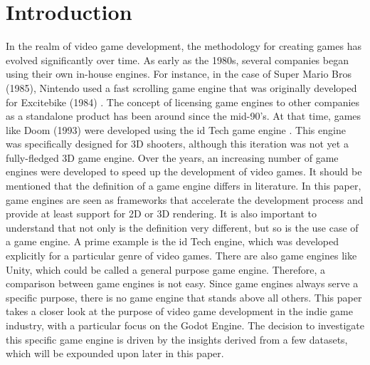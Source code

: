 \section{Introduction}
In the realm of video game development, the methodology for creating games has evolved significantly over time.
As early as the 1980s, several companies began using their own in-house engines.
For instance, in the case of Super Mario Bros (1985), Nintendo used a fast scrolling game engine that was originally developed for Excitebike (1984) \cite{history-digital-games}.
The concept of licensing game engines to other companies as a standalone product has been around since the mid-90's.
At that time, games like Doom (1993) were developed using the id Tech game engine \cite{id-tech-doom}.
This engine was specifically designed for 3D shooters, although this iteration was not yet a fully-fledged 3D game engine.
Over the years, an increasing number of game engines were developed to speed up the development of video games.
It should be mentioned that the definition of a game engine differs in literature.
In this paper, game engines are seen as frameworks that accelerate the development process and provide at least support for 2D or 3D rendering.
It is also important to understand that not only is the definition very different, but so is the use case of a game engine.
A prime example is the id Tech engine, which was developed explicitly for a particular genre of video games.
There are also game engines like Unity, which could be called a general purpose game engine.
Therefore, a comparison between game engines is not easy.
Since game engines always serve a specific purpose, there is no game engine that stands above all others.
This paper takes a closer look at the purpose of video game development in the indie game industry, with a particular focus on the Godot Engine.
The decision to investigate this specific game engine is driven by the insights derived from a few datasets, which will be expounded upon later in this paper.
